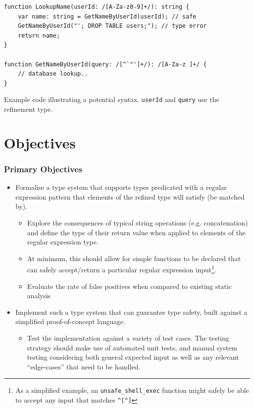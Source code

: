 \documentclass[a4paper,openany,12pt]{book}
\begin{document}
\begin{listing}[H]
    \begin{verbatim}
function LookupName(userId: /[A-Za-z0-9]+/): string {
    var name: string = GetNameByUserId(userId); // safe
    GetNameByUserId("'; DROP TABLE users;"); // type error
    return name;
}

function GetNameByUserId(query: /[^`"']+/): /[A-Za-z ]+/ {
    // database lookup..
}
    \end{verbatim}
    \caption{Example code illustrating a potential syntax. \texttt{userId} and \texttt{query} use the refinement type.}
\end{listing}
\section*{Objectives}



\subsubsection*{Primary Objectives}

\begin{itemize}
    \item Formalise a type system that supports types predicated with a regular expression pattern that elements of the refined type will satisfy (be matched by).
    
    \begin{itemize}
        \item Explore the consequences of typical string operations (e.g. concatenation) and define the type of their return value when applied to elements of the regular expression type.
        
        \item At minimum, this should allow for simple functions to be declared that can safely accept/return a particular regular expression input\footnote{As a simplified example, an \texttt{unsafe\_shell\_exec} function might safely be able to accept any input that matches \texttt{\textasciicircum{}[\textasciicircum{}\textasciigrave{}]\textdollar{}}}.
        
        \item Evaluate the rate of false positives when compared to existing static analysis 
    \end{itemize}
    
    \item Implement such a type system that can guarantee type safety, built against a simplified proof-of-concept language.
    \begin{itemize}
        \item Test the implementation against a variety of test cases. The testing strategy should make use of automated unit tests, and manual system testing considering both general expected input as well as any relevant ``edge-cases'' that need to be handled.
    \end{itemize}
\end{itemize}
\end{document}
